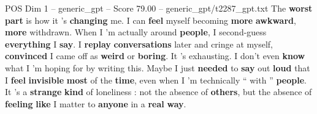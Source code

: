 \begin{textsample}{POS Dim 1 – generic\_gpt – Score 79.00 – generic\_gpt/t2287\_gpt.txt}
The \textbf{worst} \textbf{part} is how it ’s \textbf{changing} me.
I can \textbf{feel} myself becoming \textbf{more} \textbf{awkward}, \textbf{more} withdrawn.
When I ’m actually around \textbf{people}, I second-guess \textbf{everything} I \textbf{say}.
I \textbf{replay} \textbf{conversations} later and cringe at myself, \textbf{convinced} I came off as \textbf{weird} or \textbf{boring}.
It ’s exhausting.
I don't even \textbf{know} what I ’m hoping for by writing this.
Maybe I just \textbf{needed} to \textbf{say} out \textbf{loud} that I \textbf{feel} \textbf{invisible} \textbf{most} of the \textbf{time}, even when I ’m technically “ with ” \textbf{people}.
It ’s a \textbf{strange} \textbf{kind} of loneliness : not the absence of \textbf{others}, but the absence of \textbf{feeling} \textbf{like} I matter to \textbf{anyone} in a \textbf{real} \textbf{way}.

\end{textsample}
